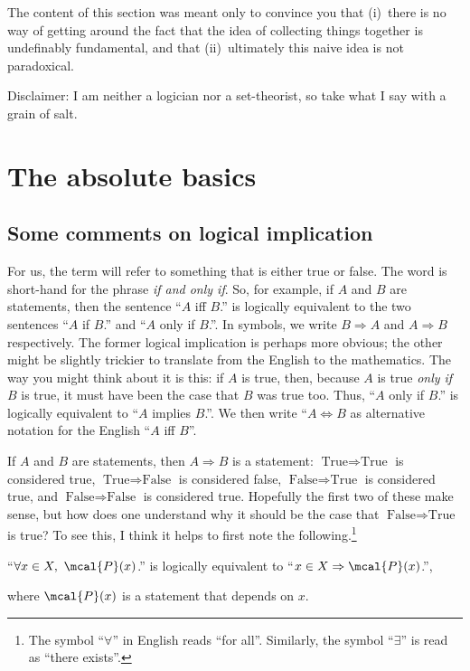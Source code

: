 The content of this section was meant only to convince you that (i)~there is no way of getting around the fact that the idea of collecting things together is undefinably fundamental, and that (ii)~ultimately this naive idea is not paradoxical.

Disclaimer:  I am neither a logician nor a set-theorist, so take what I say with a grain of salt.

\section{The absolute basics}\label{sbsA.1.2}

\subsection{Some comments on logical implication}

For us, the term  will refer to something that is either true or false.  The word  is short-hand for the phrase \emph{if and only if}.  So, for example, if $A$ and $B$ are statements, then the sentence ``$A$ iff $B$.'' is logically equivalent to the two sentences ``$A$ if $B$.'' and ``$A$ only if $B$.''.  In symbols, we write $B\Rightarrow A$ and $A\Rightarrow B$ respectively.  The former logical implication is perhaps more obvious; the other might be slightly trickier to translate from the English to the mathematics.  The way you might think about it is this:  if $A$ is true, then, because $A$ is true \emph{only if} $B$ is true, it must have been the case that $B$ was true too.  Thus, ``$A$ only if $B$.'' is logically equivalent to ``$A$ implies $B$.''.  We then write ``$A\Leftrightarrow B$ as alternative notation for the English ``$A$ iff $B$''.

If $A$ and $B$ are statements, then $A\Rightarrow B$ is a statement:  $\text{True}\Rightarrow \text{True}$ is considered true, $\text{True}\Rightarrow \text{False}$ is considered false, $\text{False}\Rightarrow \text{True}$ is considered true, and $\text{False}\Rightarrow \text{False}$ is considered true.  Hopefully the first two of these make sense, but how does one understand why it should be the case that $\text{False}\Rightarrow \text{True}$ is true?  To see this, I think it helps to first note the following.\footnote{The symbol ``$\forall$\index[notation]{$\forall$}'' in English reads ``for all''.  Similarly, the symbol ``$\exists$\index[notation]{$\exists$}'' is read as ``there exists''.}
\begin{textequation}[A.1.3]
``$\forall x\in X,\ \mcal{P}(x)$.'' is logically equivalent to ``$x\in X\Rightarrow \mcal{P}(x)$.'',
\end{textequation}
where $\mcal{P}(x)$ is a statement that depends on $x$.

